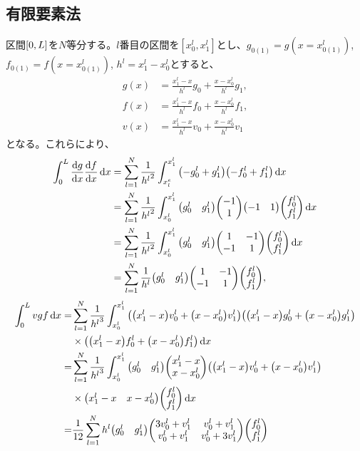 \documentclass[xelatex,ja=standard]{bxjsarticle}
\begin{document}
\subsection{有限要素法}
区間$\qty[0,L]$を$N$等分する。$l$番目の区間を$[x^l_0,x^l_1]$とし、$g_{0(1)} = g(x=x^l_{0(1)})$, $f_{0(1)} = f(x=x^l_{0(1)})$, $h^l = x^l_1 - x^l_0$とすると、
\begin{align}
    g(x) &= \frac{x^l_1 - x}{h^l}g_0 + \frac{x-x^l_0}{h^l}g_1,\\
    f(x) &= \frac{x^l_1 - x}{h^l}f_0 + \frac{x-x^l_0}{h^l}f_1,\\
    v(x) &= \frac{x^l_1 - x}{h^l}v_0 + \frac{x-x^l_0}{h^l}v_1
\end{align}
となる。これらにより、
\begin{align}
    \int_0^L \dv{g}{x}\dv{f}{x}\dd{x} 
    &= \sum_{l=1}^N \frac{1}{{h^l}^2}\int_{x_l^e}^{x^l_1}\qty(-g^l_0 + g^l_1)\qty(-f^l_0 + f^l_1)\dd{x}\notag\\
    &= \sum_{l=1}^N \frac{1}{{h^l}^2}\int_{x^l_0}^{x^l_1}\mqty(g^l_0 & g^l_1)\mqty(-1\\1)\mqty(-1 & 1)\mqty(f^l_0 \\ f^l_1)\dd{x}\notag\\
    &= \sum_{l=1}^N \frac{1}{{h^l}^2}\int_{x^l_0}^{x^l_1}\mqty(g^l_0 & g^l_1)\mqty(1 & -1 \\ -1 & 1)\mqty(f^l_0 \\ f^l_1)\dd{x}\notag\\
    &= \sum_{l=1}^N \frac{1}{h^l}\mqty(g^l_0 & g^l_1)\mqty(1 & -1 \\ -1 & 1)\mqty(f^l_0 \\ f^l_1),
\end{align}
\begin{align}
    \int_0^L vgf\dd{x}
    =& \sum_{l=1}^N \frac{1}{{h^l}^3}\int_{x^l_0}^{x^l_1}
    \qty(\qty(x^l_1 - x)v^l_0 + \qty(x-x^l_0)v^l_1)
    \qty(\qty(x^l_1 - x)g^l_0 + \qty(x-x^l_0)g^l_1)\notag\\
    &\times\qty(\qty(x^l_1 - x)f^l_0 + \qty(x-x^l_0)f^l_1)
    \dd{x}\notag\\
    =& \sum_{l=1}^N \frac{1}{{h^l}^3}\int_{x^l_0}^{x^l_1}
    \mqty(g^l_0 & g^l_1) \mqty(x^l_1 - x \\ x-x^l_0)
    \qty(\qty(x^l_1 - x)v^l_0 + \qty(x-x^l_0)v^l_1)\notag\\
    &\times\mqty(x^l_1 - x & x-x^l_0)\mqty(f^l_0 \\ f^l_1)
    \dd{x}\notag\\
    =& \frac{1}{12}\sum_{l=1}^N h^l
    \mqty(g^l_0 & g^l_1) \mqty(3v_0^l +v_1^l & v_0^l +v_1^l\\ v_0^l +v_1^l&v_0^l +3v_1^l)\mqty(f^l_0 \\ f^l_1)
\end{align}
\end{document}
